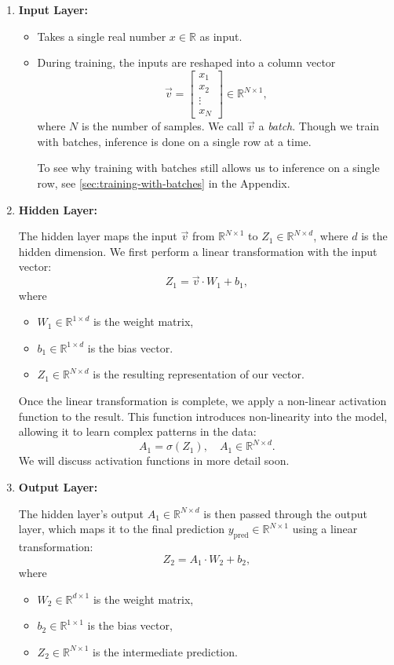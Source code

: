 \begin{enumerate}
    \item \textbf{Input Layer:}
    \begin{itemize}
        \item Takes a single real number $x\in \mathbb{R}$ as input.
        \item During training, the inputs are reshaped into a column vector $$\vec{v}=\begin{bmatrix}x_1\\x_2\\\vdots\\x_N\end{bmatrix}\in\mathbb{R}^{N\times 1},$$ where $N$ is the number of samples. We call $\vec{v}$ a \emph{batch}. Though we train with batches, inference is done on a single row at a time. 
        
        To see why training with batches still allows us to inference on a single row, see \ref{sec:training-with-batches} in the Appendix.

    \end{itemize}
    \item \textbf{Hidden Layer:}
    
    The hidden layer maps the input $\vec{v}$ from $\mathbb{R}^{N\times 1}$ to $Z_1\in\mathbb{R}^{N\times d}$, where $d$ is the hidden dimension.
    We first perform a linear transformation with the input vector:
    $$Z_1 = \vec{v}\cdot W_1 + b_1,$$
    where 
    \begin{itemize}
        \item $W_1\in\mathbb{R}^{1\times d}$ is the weight matrix,
        \item $b_1\in\mathbb{R}^{1\times d}$ is the bias vector.
        \item $Z_1\in\mathbb{R}^{N\times d}$ is the resulting representation of our vector.
    \end{itemize}
    Once the linear transformation is complete, we apply a non-linear activation function to the result. This function introduces non-linearity into the model, allowing it to learn complex patterns in the data:
    $$ A_1 = \sigma(Z_1), \quad A_1\in\mathbb{R}^{N\times d}.$$
    We will discuss activation functions in more detail soon.

    \item \textbf{Output Layer:}
    
    The hidden layer's output $A_1\in\mathbb{R}^{N\times d}$ is then passed through the output layer, which maps it to the final prediction $y_{\text{pred}}\in\mathbb{R}^{N\times 1}$ using a linear transformation:
    $$Z_2 = A_1\cdot W_2 + b_2,$$
    where
    \begin{itemize}
        \item $W_2\in\mathbb{R}^{d\times 1}$ is the weight matrix,
        \item $b_2\in\mathbb{R}^{1\times 1}$ is the bias vector,
        \item $Z_2\in\mathbb{R}^{N\times 1}$ is the intermediate prediction.
    \end{itemize}
    

\end{enumerate}
